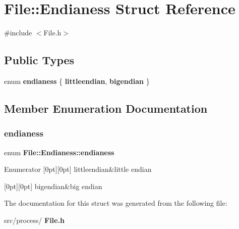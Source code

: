 \section{File\+:\+:Endianess Struct Reference}
\label{struct_file_1_1_endianess}


{\ttfamily \#include $<$File.\+h$>$}

\subsection*{Public Types}
\begin{DoxyCompactItemize}
\item 
enum \textbf{ endianess} \{ \textbf{ littleendian}, 
\textbf{ bigendian}
 \}
\end{DoxyCompactItemize}


\subsection{Member Enumeration Documentation}
\mbox{\label{struct_file_1_1_endianess_ac80818ac42fdd0c9aa29d424e65fa37e}} 
\subsubsection{endianess}
{\footnotesize\ttfamily enum \textbf{ File\+::\+Endianess\+::endianess}}

\begin{DoxyEnumFields}{Enumerator}
[0pt][0pt]{}\mbox{\label{struct_file_1_1_endianess_ac80818ac42fdd0c9aa29d424e65fa37ea3cb0abec70bab3c0e492ef9b57d4f4da}} 
littleendian&little endian \\
\hline

[0pt][0pt]{}\mbox{\label{struct_file_1_1_endianess_ac80818ac42fdd0c9aa29d424e65fa37ea7dcfb82e9bd382f1eab49a0d48993944}} 
bigendian&big endian \\
\hline

\end{DoxyEnumFields}


The documentation for this struct was generated from the following file\+:\begin{DoxyCompactItemize}
\item 
src/process/\textbf{ File.\+h}\end{DoxyCompactItemize}
